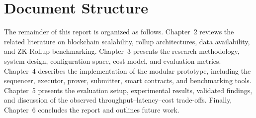 \section{Document Structure}
\label{sec:document_structure}

The remainder of this report is organized as follows. Chapter~2 reviews the related literature on blockchain scalability, rollup architectures, data availability, and ZK-Rollup benchmarking. Chapter~3 presents the research methodology, system design, configuration space, cost model, and evaluation metrics. Chapter~4 describes the implementation of the modular prototype, including the sequencer, executor, prover, submitter, smart contracts, and benchmarking tools. Chapter~5 presents the evaluation setup, experimental results, validated findings, and discussion of the observed throughput--latency--cost trade-offs. Finally, Chapter~6 concludes the report and outlines future work.
